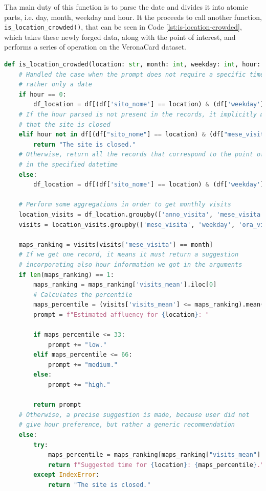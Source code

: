 Tha main duty of this function is to parse the date and divides it into atomic parts, i.e. day, month, weekday and hour. It the proceeds to call another function, \texttt{is\_location\_crowded()}, that can be seen in Code \ref{lst:is-location-crowded}, which takes these newly forged data, along with the point of interest, and performs a series of operation on the VeronaCard dataset.

\begin{center}
\begin{lstlisting}[language=Python, frame=single, caption=\texttt{is\_location\_crowded()} Function., label=lst:is-location-crowded]
def is_location_crowded(location: str, month: int, weekday: int, hour: int) -> str:
    # Handled the case when the prompt does not require a specific time,
    # rather only a date
    if hour == 0:
        df_location = df[(df['sito_nome'] == location) & (df['weekday'] == int(weekday))]
    # If the hour parsed is not present in the records, it implicitly means
    # that the site is closed
    elif hour not in df[(df["sito_nome"] == location) & (df["mese_visita"] == month)]["ora_visita_intervallo"].unique():
        return "The site is closed."
    # Otherwise, return all the records that correspond to the point of interest
    # in the specified datetime
    else:
        df_location = df[(df['sito_nome'] == location) & (df['weekday'] == int(weekday)) & (df['ora_visita_intervallo'] == int(hour))]

    # Perform some aggregations in order to get monthly visits
    location_visits = df_location.groupby(['anno_visita', 'mese_visita', 'weekday', 'ora_visita_intervallo']).size().reset_index(name='visits_number')
    visits = location_visits.groupby(['mese_visita', 'weekday', 'ora_visita_intervallo'])['visits_number'].mean().reset_index(name='visits_mean')

    maps_ranking = visits[visits['mese_visita'] == month]
    # If we get one record, it means it must return a suggestion
    # incorporating also hour information we got in the arguments
    if len(maps_ranking) == 1:
        maps_ranking = maps_ranking['visits_mean'].iloc[0]
        # Calculates the percentile
        maps_percentile = (visits['visits_mean'] <= maps_ranking).mean() * 100
        prompt = f"Estimated affluency for {location}: "

        if maps_percentile <= 33:
            prompt += "low."
        elif maps_percentile <= 66:
            prompt += "medium."
        else:
            prompt += "high."

        return prompt
    # Otherwise, a precise suggestion is made, because user did not
    # give hour preference, but rather a generic recommendation
    else:
        try:
            maps_percentile = maps_ranking[maps_ranking["visits_mean"] < maps_ranking["visits_mean"].median()].sort_values(by="ora_visita_intervallo")["ora_visita_intervallo"].iloc[0]
            return f"Suggested time for {location}: {maps_percentile}."
        except IndexError:
            return "The site is closed."
\end{lstlisting}
\end{center}

